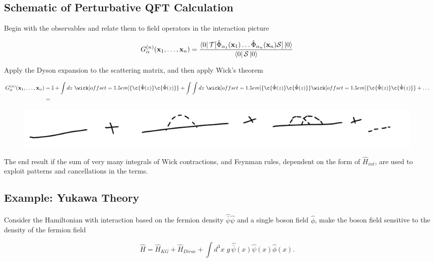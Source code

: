 \subsection*{Schematic of Perturbative QFT Calculation }

\noindent Begin with the observables and relate them to field operators in the interaction picture

\begin{equation}
G^{(n)}_\alpha (\textbf{x}_1, \dots, \textbf{x}_n) = \frac{\bra{0} \mathcal{T} [\hat{\Phi}_{\alpha_1} (\textbf{x}_1) \dots \hat{\Phi}_{\alpha_n} (\textbf{x}_n) \mathcal{S} ] \ket{0}}{\bra{0} \mathcal{S} \ket{0}}
\end{equation}

\noindent Apply the Dyson expansion to the scattering matrix, and then apply Wick's theorem

\begin{align}
G^{(n)}_\alpha (\textbf{x}_1, \dots, \textbf{x}_n) &= \mathbb{I} + \int dz \,\, \wick[offset=1.5em]{\c {\hat{\Phi}(z)} \c {\hat{\Phi}(z)}} + \int\int dz \,\, \wick[offset=1.5em]{\c {\hat{\Phi}(z)} \c {\hat{\Phi}(z)}} \wick[offset=1.5em]{\c {\hat{\Phi}(z)} \c {\hat{\Phi}(z)}} + \dots \\
&=
\end{align}

\begin{figure}[H]\centering \includegraphics[scale=0.4]{lots.png}  \end{figure}

\noindent The end result if the sum of very many integrals of Wick contractions, and Feynman rules, dependent on the form of $\hat{H}_{int}$, are used to exploit patterns and cancellations in the terms. 

\subsection*{Example: Yukawa Theory}

\noindent Consider the Hamiltonian with interaction based on the fermion density $\hat{\bar{\psi}} \hat{\psi}$ and a single boson field $\hat{\phi}$, make the boson field sensitive to the density of the fermion field

\begin{equation}
\hat{H} =\hat{H}_{KG} + \hat{H}_{Dirac} + \int d^3 x \,\, g \, \hat{\bar{\psi}}(x) \hat{\psi}(x) \hat{\phi}(x).
\end{equation}

